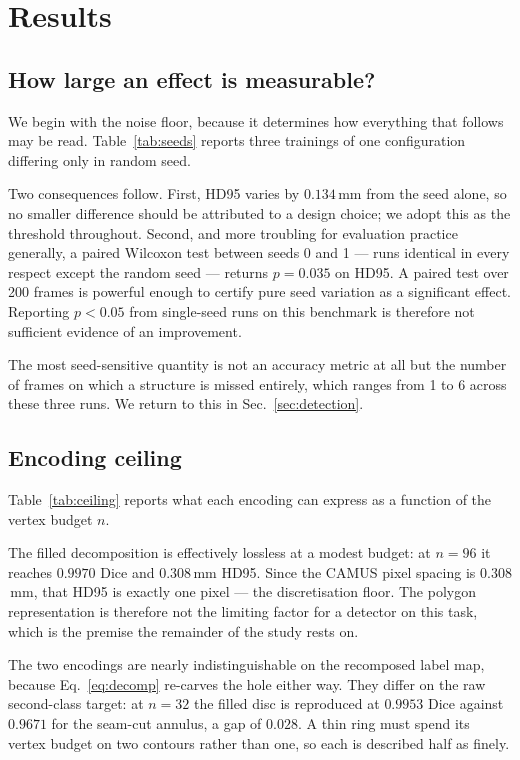\section{Results}
\label{sec:results}

\subsection{How large an effect is measurable?}
\label{sec:noise}

We begin with the noise floor, because it determines how everything that follows
may be read. Table~\ref{tab:seeds} reports three trainings of one configuration
differing only in random seed.



Two consequences follow. First, HD95 varies by $0.134$\,mm from the seed alone,
so no smaller difference should be attributed to a design choice; we adopt this
as the threshold throughout. Second, and more troubling for evaluation practice
generally, a paired Wilcoxon test between seeds 0 and 1 --- runs identical in
every respect except the random seed --- returns $p{=}0.035$ on HD95. A paired
test over 200 frames is powerful enough to certify pure seed variation as a
significant effect. Reporting $p<0.05$ from single-seed runs on this benchmark
is therefore not sufficient evidence of an improvement.

The most seed-sensitive quantity is not an accuracy metric at all but the number
of frames on which a structure is missed entirely, which ranges from 1 to 6
across these three runs. We return to this in Sec.~\ref{sec:detection}.

\subsection{Encoding ceiling}

Table~\ref{tab:ceiling} reports what each encoding can express as a function of
the vertex budget $n$.



The filled decomposition is effectively lossless at a modest budget: at $n{=}96$
it reaches $0.9970$ Dice and $0.308$\,mm HD95. Since the CAMUS pixel spacing is
$0.308$\,mm, that HD95 is exactly one pixel --- the discretisation floor. The
polygon representation is therefore not the limiting factor for a detector on
this task, which is the premise the remainder of the study rests on.

The two encodings are nearly indistinguishable on the recomposed label map,
because Eq.~\ref{eq:decomp} re-carves the hole either way. They differ on the
raw second-class target: at $n{=}32$ the filled disc is reproduced at $0.9953$
Dice against $0.9671$ for the seam-cut annulus, a gap of $0.028$. A thin ring
must spend its vertex budget on two contours rather than one, so each is
described half as finely.

